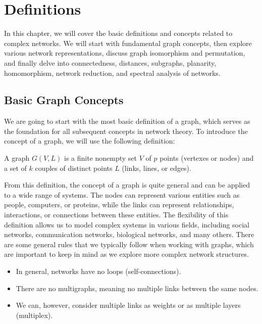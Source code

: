 \chapter{Definitions}

In this chapter, we will cover the basic definitions and concepts related to complex networks. We will start with fundamental graph concepts, then explore various network representations, discuss graph isomorphism and permutation, and finally delve into connectedness, distances, subgraphs, planarity, homomorphism, network reduction, and spectral analysis of networks.

\section{Basic Graph Concepts}

We are going to start with the most basic definition of a graph, which serves as the foundation for all subsequent concepts in network theory. To introduce the concept of a graph, we will use the following definition:

\begin{definition}[Graph]
    A graph $G(V,L)$ is a finite nonempty set $V$ of $p$ points (vertexes or nodes) and a set of $k$ couples of distinct points $L$ (links, lines, or edges).
\end{definition}

From this definition, the concept of a graph is quite general and can be applied to a wide range of systems. The nodes can represent various entities such as people, computers, or proteins, while the links can represent relationships, interactions, or connections between these entities. The flexibility of this definition allows us to model complex systems in various fields, including social networks, communication networks, biological networks, and many others. There are some general rules that we typically follow when working with graphs, which are important to keep in mind as we explore more complex network structures.

\begin{remark}
    \begin{itemize}
        \item In general, networks have no loops (self-connections).
        \item There are no multigraphs, meaning no multiple links between the same nodes.
        \item We can, however, consider multiple links as weights or as multiple layers (multiplex).
    \end{itemize}
\end{remark}


